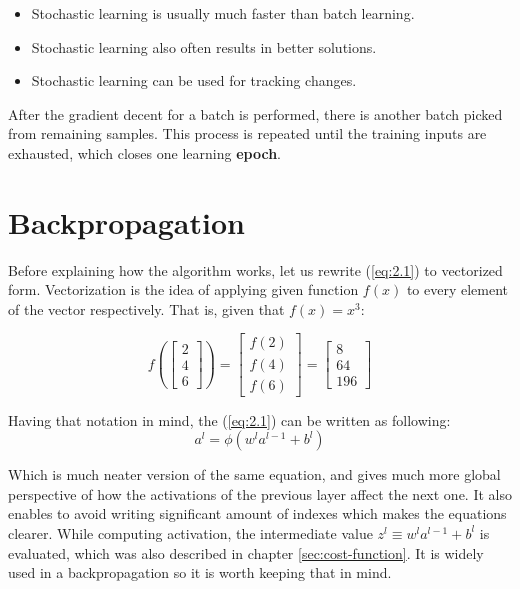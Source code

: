 \begin{itemize}
    \item Stochastic learning is usually much faster than batch learning.
    \item Stochastic learning also often results in better solutions.
    \item Stochastic learning can be used for tracking changes.
\end{itemize}

After the gradient decent for a batch is performed, there is another batch picked from remaining samples. This process is repeated until the training inputs are exhausted, which closes one learning \textbf{epoch}.

\section{Backpropagation}
\label{sec:backpropagation}

Before explaining how the algorithm works, let us rewrite (\ref{eq:2.1}) to vectorized form. Vectorization is the idea of applying given function $f(x)$ to every element of the vector respectively. That is, given that $f(x) = x^3$:

\begin{equation}
    f\left(\begin{bmatrix}
         2 \\
         4 \\
         6
    \end{bmatrix}
    \right) =
    \begin{bmatrix}
        f(2) \\
        f(4) \\
        f(6)
    \end{bmatrix} = 
    \begin{bmatrix}
        8 \\
        64 \\
        196
    \end{bmatrix}
\end{equation}

Having that notation in mind, the (\ref{eq:2.1}) can be written as following:
\begin{equation}
    a^l = \phi \left(w^la^{l-1} + b^l \right)
\end{equation}

Which is much neater version of the same equation, and gives much more global perspective of how the activations of the previous layer
affect the next one. It also enables to avoid writing significant amount of indexes which makes the equations clearer.
While computing activation, the intermediate value $z^l \equiv w^la^{l-1}+b^l$ is evaluated, which was also described in chapter
\ref{sec:cost-function}. It is widely used in a backpropagation so it is worth keeping that in mind.

